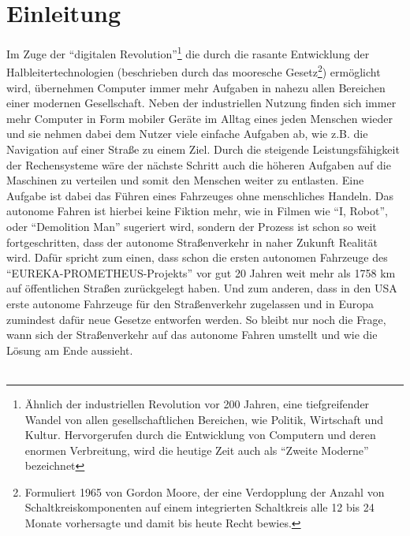 \section{Einleitung}
Im Zuge der "`digitalen Revolution"'\footnote{Ähnlich der industriellen Revolution vor 200 Jahren, eine tiefgreifender Wandel von allen gesellschaftlichen Bereichen, wie Politik, Wirtschaft und Kultur. Hervorgerufen durch die Entwicklung von Computern und deren enormen Verbreitung, wird die heutige Zeit auch als "`Zweite Moderne"' bezeichnet} die durch die rasante Entwicklung der Halbleitertechnologien (beschrieben durch das mooresche Gesetz\footnote{Formuliert 1965 von Gordon Moore, der eine Verdopplung der Anzahl von Schaltkreiskomponenten auf einem integrierten Schaltkreis alle 12 bis 24 Monate vorhersagte und damit bis heute Recht bewies.}) ermöglicht wird, übernehmen Computer immer mehr Aufgaben in nahezu allen Bereichen einer modernen Gesellschaft. Neben der industriellen Nutzung finden sich immer mehr Computer in Form mobiler Geräte im Alltag eines jeden Menschen wieder und sie nehmen dabei dem Nutzer viele einfache Aufgaben ab, wie z.B. die Navigation auf einer Straße zu einem Ziel. Durch die steigende Leistungsfähigkeit der Rechensysteme wäre der nächste Schritt auch die höheren Aufgaben auf die Maschinen zu verteilen und somit den Menschen weiter zu entlasten. Eine Aufgabe ist dabei das Führen eines Fahrzeuges ohne menschliches Handeln. Das autonome Fahren ist hierbei keine Fiktion mehr, wie in Filmen wie "`I, Robot"'\cite{iRob}, oder "`Demolition Man"'\cite{DemMan} sugeriert wird, sondern der Prozess ist schon so weit fortgeschritten, dass der autonome Straßenverkehr in naher Zukunft Realität wird. Dafür spricht zum einen, dass schon die ersten autonomen Fahrzeuge des "`EUREKA-PROMETHEUS-Projekts"' \cite{Prom} vor gut 20 Jahren weit mehr als 1758 km auf öffentlichen Straßen zurückgelegt haben. Und zum anderen, dass in den USA erste autonome Fahrzeuge für den Straßenverkehr zugelassen\cite{Neva} und in Europa zumindest dafür neue Gesetze entworfen werden\cite{Dobri}. So bleibt nur noch die Frage, wann sich der Straßenverkehr auf das autonome Fahren umstellt und wie die Lösung am Ende aussieht.\\ \\
